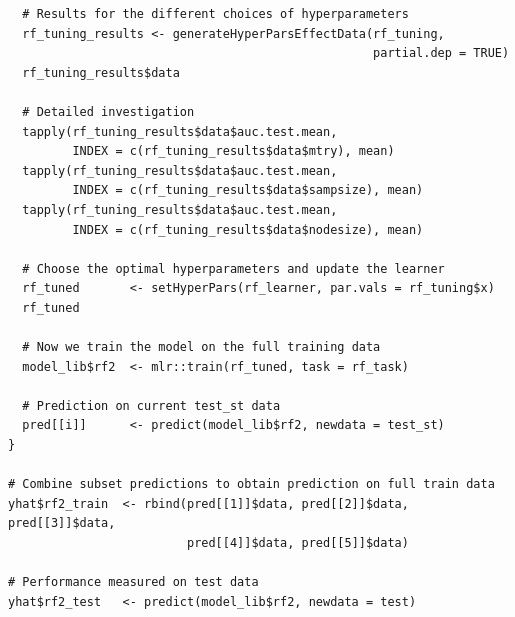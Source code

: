 \documentclass[12pt]{article}
\begin{document}
\begin{lstlisting}
  # Results for the different choices of hyperparameters
  rf_tuning_results <- generateHyperParsEffectData(rf_tuning, 
                                                   partial.dep = TRUE)
  rf_tuning_results$data
  
  # Detailed investigation
  tapply(rf_tuning_results$data$auc.test.mean, 
         INDEX = c(rf_tuning_results$data$mtry), mean)
  tapply(rf_tuning_results$data$auc.test.mean, 
         INDEX = c(rf_tuning_results$data$sampsize), mean)
  tapply(rf_tuning_results$data$auc.test.mean, 
         INDEX = c(rf_tuning_results$data$nodesize), mean)
  
  # Choose the optimal hyperparameters and update the learner
  rf_tuned       <- setHyperPars(rf_learner, par.vals = rf_tuning$x)
  rf_tuned
  
  # Now we train the model on the full training data 
  model_lib$rf2  <- mlr::train(rf_tuned, task = rf_task)
  
  # Prediction on current test_st data
  pred[[i]]      <- predict(model_lib$rf2, newdata = test_st)
}

# Combine subset predictions to obtain prediction on full train data
yhat$rf2_train  <- rbind(pred[[1]]$data, pred[[2]]$data, pred[[3]]$data,
                         pred[[4]]$data, pred[[5]]$data)

# Performance measured on test data 
yhat$rf2_test   <- predict(model_lib$rf2, newdata = test)
\end{lstlisting}
\end{document}
